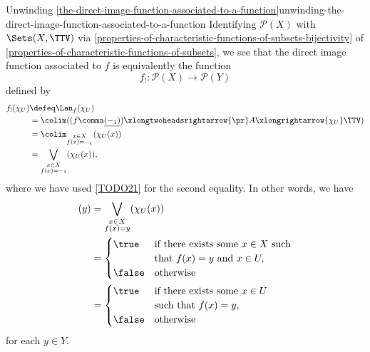 \begin{remark}{Unwinding \cref{the-direct-image-function-associated-to-a-function}}{unwinding-the-direct-image-function-associated-to-a-function}%
    Identifying $\mathcal{P}(X)$ with $\Sets(X,\TTV)$ via \cref{properties-of-characteristic-functions-of-subsets-bijectivity} of \cref{properties-of-characteristic-functions-of-subsets}, we see that the direct image function associated to $f$ is equivalently the function
    \[
        f_{!}%
        \colon%
        \mathcal{P}(X)%
        \to%
        \mathcal{P}(Y)%
    \]%
    defined by
    \begin{align*}
        f_{!}(\chi_{U}) &\defeq \Lan_{f}(\chi_{U})\\%
                        &=      \colim((f\comma\underline{(-_{1})})\xlongtwoheadsrightarrow{\pr}A\xlongrightarrow{\chi_{U}}\TTV)\\%
                        &=      \colim_{\substack{x\in X\\f(x)=-_{1}}}(\chi_{U}(x))\\%
                        &=      \bigvee_{\substack{x\in X\\f(x)=-_{1}}}(\chi_{U}(x)),%
    \end{align*}
    where we have used \cref{TODO21} for the second equality. In other words, we have
    \begin{align*}
        [f_{!}(\chi_{U})](y)%
        &=%
        \bigvee_{\substack{x\in X\\f(x)=y}}(\chi_{U}(x))\\%
        &=%
        \begin{cases}
            \true  &\text{if there exists some $x\in X$ such}\\
                   &\text{that $f(x)=y$ and $x\in U,$}\\
            \false &\text{otherwise}
        \end{cases}\\
        &=%
        \begin{cases}
            \true  &\text{if there exists some $x\in U$}\\
                   &\text{such that $f(x)=y$,}\\
            \false &\text{otherwise}
        \end{cases}
    \end{align*}
    for each $y\in Y$.
\end{remark}
